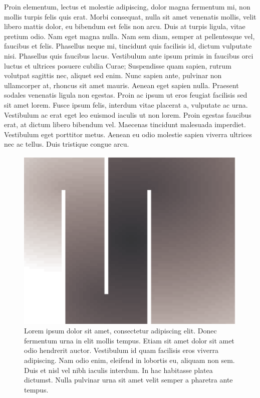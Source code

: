     Proin elementum, lectus et molestie adipiscing, dolor magna fermentum mi, non 
    mollis turpis felis quis erat. Morbi consequat, nulla sit amet venenatis mollis, 
    velit libero mattis dolor, eu bibendum est felis non arcu. Duis at turpis ligula, 
    vitae pretium odio. Nam eget magna nulla. Nam sem diam, semper at pellentesque 
    vel, faucibus et felis. Phasellus neque mi, tincidunt quis facilisis id, dictum 
    vulputate nisi. Phasellus quis faucibus lacus. Vestibulum ante ipsum primis in 
    faucibus orci luctus et ultrices posuere cubilia Curae; Suspendisse quam sapien, 
    rutrum volutpat sagittis nec, aliquet sed enim. Nunc sapien ante, pulvinar non 
    ullamcorper at, rhoncus sit amet mauris. Aenean eget sapien nulla. Praesent 
    sodales venenatis ligula non egestas. Proin ac ipsum ut eros feugiat facilisis sed 
    sit amet lorem. Fusce ipsum felis, interdum vitae placerat a, vulputate ac urna. 
    Vestibulum ac erat eget leo euismod iaculis ut non lorem. Proin egestas faucibus 
    erat, at dictum libero bibendum vel. Maecenas tincidunt malesuada imperdiet. 
    Vestibulum eget porttitor metus. Aenean eu odio molestie sapien viverra ultrices 
    nec ac tellus. Duis tristique congue arcu.

    \begin{figure}[p]
        \begin{center}
            \includegraphics{godunov-1/godunov-dist-009}
        \end{center}
        \caption[Lorem ipsum dolor sit amet, consectetur adipiscing elit.]
                {Lorem ipsum dolor sit amet, consectetur adipiscing elit. Donec fermentum 
                    urna in elit mollis tempus. Etiam sit amet dolor sit amet odio hendrerit 
                    auctor. Vestibulum id quam facilisis eros viverra adipiscing. Nam odio 
                    enim, eleifend in lobortis eu, aliquam non sem. Duis et nisl vel nibh 
                    iaculis interdum. In hac habitasse platea dictumst. Nulla pulvinar urna 
                    sit amet velit semper a pharetra ante tempus. 
                    }
        \label{fig:heaviside-regularization-2} 
    \end{figure}

